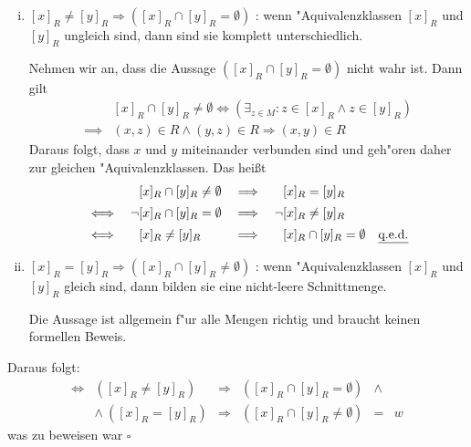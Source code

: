 \documentclass[10pt, oneside]{article}
\begin{document}
\begin{enumerate}[i)]
    \item $[x]_R \neq [y]_R \Rightarrow ([x]_R \cap [y]_R = \emptyset)$ : wenn
        "Aquivalenzklassen $[x]_R$ und $[y]_R$ ungleich sind, dann sind sie
        komplett unterschiedlich.

        Nehmen wir an, dass die Aussage $([x]_R \cap [y]_R = \emptyset)$ nicht wahr ist.
        Dann gilt
        \begin{equation*}
            \begin{array}{rc}
                        &[x]_R \cap [y]_R \neq \emptyset \Leftrightarrow (\exists_{z \in M} : z \in [x]_R \land z \in [y]_R)  \\[5pt]
                \implies& (x, z) \in R \land (y, z) \in R \Rightarrow (x, y) \in R
            \end{array}
        \end{equation*}
        Daraus folgt, dass $x$ und $y$ miteinander verbunden sind und geh"oren
        daher zur gleichen "Aquivalenzklassen. Das hei{\ss}t
        \begin{equation*}
            \begin{array}{rlcl}
                      &\phantom{\lnot}[x]_R \cap [y]_R \neq \emptyset &\implies& \phantom{\lnot}[x]_R = [y]_R \\[5pt]
                \iff  &\lnot[x]_R \cap [y]_R =    \emptyset &\implies& \lnot[x]_R \neq [y]_R \\[5pt]
                \iff  &\phantom{\lnot}[x]_R \neq [y]_R                &\implies& \phantom{\lnot}[x]_R \cap [y]_R =    \emptyset \quad \text{\underline{q.e.d.}}
            \end{array}
        \end{equation*}
    \item $[x]_R = [y]_R \Rightarrow ([x]_R \cap [y]_R \neq \emptyset)$ : wenn
        "Aquivalenzklassen $[x]_R$ und $[y]_R$ gleich sind, dann bilden sie
        eine nicht-leere Schnittmenge.

        Die Aussage ist allgemein f"ur alle Mengen richtig und braucht keinen
        formellen Beweis.
\end{enumerate}

Daraus folgt:
\begin{equation*}
    \begin{array}{rrcrcl}
        \iff             &([x]_R \neq [y]_R) &\Rightarrow& ([x]_R \cap [y]_R    = \emptyset) &\land& \\[5pt]
                  &\land\ ([x]_R = [y]_R)    &\Rightarrow& ([x]_R \cap [y]_R \neq \emptyset) &=& w
     \end{array}
\end{equation*}
was zu beweisen war $\square$
\end{document}
